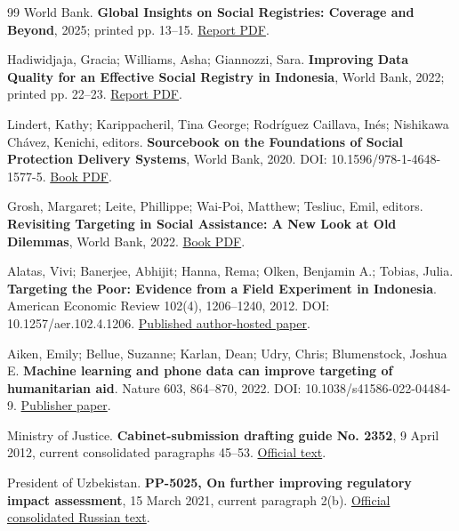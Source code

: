 \begin{thebibliography}{99}
 World Bank. \textbf{Global Insights on Social Registries: Coverage and Beyond}, 2025; printed pp. 13–15. \href{https://documents1.worldbank.org/curated/en/099071525165029379/pdf/P177331-a772f9c1-e340-4f76-aeb0-90fd4e7a3496.pdf}{Report PDF}.

 Hadiwidjaja, Gracia; Williams, Asha; Giannozzi, Sara. \textbf{Improving Data Quality for an Effective Social Registry in Indonesia}, World Bank, 2022; printed pp. 22–23. \href{https://documents1.worldbank.org/curated/en/099515110132223290/pdf/P177341026be35061089cf0d835280eaf15.pdf}{Report PDF}.

 Lindert, Kathy; Karippacheril, Tina George; Rodríguez Caillava, Inés; Nishikawa Chávez, Kenichi, editors. \textbf{Sourcebook on the Foundations of Social Protection Delivery Systems}, World Bank, 2020. DOI: 10.1596/978-1-4648-1577-5. \href{https://documents1.worldbank.org/curated/en/519831596182628993/pdf/Sourcebook-on-the-Foundations-of-Social-Protection-Delivery-Systems.pdf}{Book PDF}.

 Grosh, Margaret; Leite, Phillippe; Wai-Poi, Matthew; Tesliuc, Emil, editors. \textbf{Revisiting Targeting in Social Assistance: A New Look at Old Dilemmas}, World Bank, 2022. \href{https://documents1.worldbank.org/curated/en/099300006162240907/pdf/P1648760df4c480270bd0b02288943f413e.pdf}{Book PDF}.

 Alatas, Vivi; Banerjee, Abhijit; Hanna, Rema; Olken, Benjamin A.; Tobias, Julia. \textbf{Targeting the Poor: Evidence from a Field Experiment in Indonesia}. American Economic Review 102(4), 1206–1240, 2012. DOI: 10.1257/aer.102.4.1206. \href{https://economics.mit.edu/sites/default/files/publications/Targeting\%20Paper\%20AER\%20--\%20Final\%20Published.pdf}{Published author-hosted paper}.

Aiken, Emily; Bellue, Suzanne; Karlan, Dean; Udry, Chris; Blumenstock, Joshua E. \textbf{Machine learning and phone data can improve targeting of humanitarian aid}. Nature 603, 864–870, 2022. DOI: 10.1038/s41586-022-04484-9. \href{https://www.nature.com/articles/s41586-022-04484-9}{Publisher paper}.


Ministry of Justice. \textbf{Cabinet-submission drafting guide No. 2352}, 9 April 2012, current consolidated paragraphs 45–53. \href{https://lex.uz/docs/-1999242}{Official text}.


 President of Uzbekistan. \textbf{PP-5025, On further improving regulatory impact assessment}, 15 March 2021, current paragraph 2(b). \href{https://lex.uz/docs/5331933}{Official consolidated Russian text}.


\end{thebibliography}
